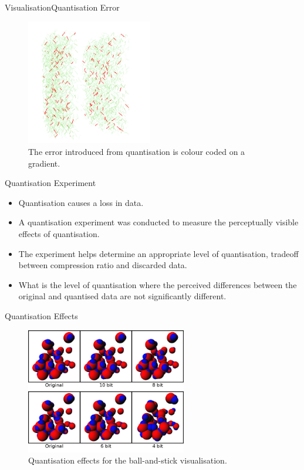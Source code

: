 \documentclass{beamer}
\begin{document}
\begin{frame}{Visualisation}{Quantisation Error}
\begin{figure}
  \centering
  \includegraphics[width=55mm]{min-images/quantisation-error-line.png}
  \caption{The error introduced from quantisation is colour coded on a gradient.}
\end{figure}
\end{frame}

\begin{frame}{Quantisation Experiment}

\begin{itemize}

  \item Quantisation causes a loss in data.

  \item A quantisation experiment was conducted to measure the perceptually visible effects of quantisation.

  \item The experiment helps determine an appropriate level of quantisation, tradeoff between compression ratio and discarded data.

  \item What is the level of quantisation where the perceived differences between the original and quantised data are not significantly different.

\end{itemize}

\end{frame}

\begin{frame}{Quantisation Effects}
\begin{figure}
  \centering
  \includegraphics[width=70mm]{min-images/ball-and-stick-4680.png}
  \caption{Quantisation effects for the ball-and-stick visualisation.}
\end{figure}
\end{frame}
\end{document}
